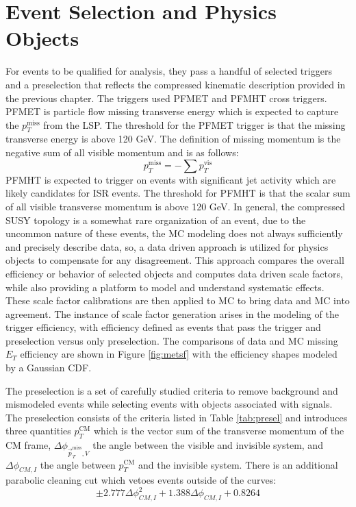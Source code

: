 \section{Event Selection and Physics Objects}
 For events to be qualified for analysis, they pass a handful of selected triggers and a preselection that reflects the compressed kinematic description provided in the previous chapter. The triggers used PFMET and PFMHT cross triggers. PFMET is particle flow missing transverse energy which is expected to capture the $p_T^{\text{miss}}$ from the LSP. The threshold for the PFMET trigger is that the missing transverse energy is above 120 GeV. The definition of missing momentum is the negative sum of all visible momentum and is as follows: 
\begin{equation}
p_T^{\text{miss}} = -\sum{p_T^{\text{vis}}}
\end{equation} 
PFMHT is expected to trigger on events with significant jet activity which are likely candidates for ISR events. The threshold for PFMHT is that the scalar sum of all visible transverse momentum is above 120 GeV.  In general, the compressed SUSY topology is a somewhat rare organization of an event, due to the uncommon nature of these events, the MC modeling does not always sufficiently and precisely describe data, so,  a data driven approach is utilized for physics objects to compensate for any disagreement. This approach compares the overall efficiency or behavior of selected objects and computes data driven scale factors, while also providing a platform to model and understand systematic effects. These scale factor calibrations are then applied to MC to bring data and MC into agreement. The instance of scale factor generation arises in the modeling of the trigger efficiency, with efficiency defined as events that pass the trigger and preselection versus only preselection. The comparisons of data and MC missing $E_T$ efficiency are shown in Figure \ref{fig:metsf} with the efficiency shapes modeled by a Gaussian CDF.  


The preselection is a set of carefully studied criteria to remove background and mismodeled events while selecting events with objects associated with signals. The preselection consists of the criteria listed in Table \ref{tab:presel} and introduces three quantities $p_T^{\text{CM}}$ which is the vector sum of the transverse momentum of the CM frame, $\Delta \phi_{\vec{p}_T^{\text{miss}}, V}$ the angle between the visible and invisible system, and $\Delta\phi_{CM,I}$ the angle between $p_T^{\text{CM}}$ and the invisible system. There is an additional  parabolic cleaning cut which vetoes events outside of the curves:
\begin{equation}
\pm2.777\Delta\phi_{CM,I}^2+1.388\Delta\phi_{CM,I}+0.8264
\end{equation}


